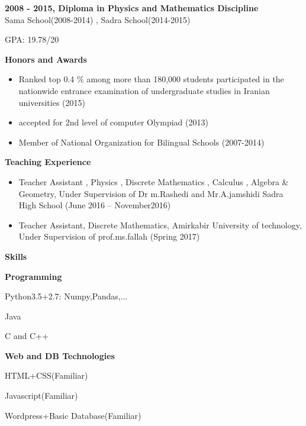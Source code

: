 \documentclass[a4paper,12pt,final]{memoir}
\newcommand{\Sep}{\vspace{1.5em}}
\newcommand{\SmallSep}{\vspace{0.5em}}
\newcommand{\CVSection}[1]
	{\Large\textbf{#1}\par
	\SmallSep\normalsize\normalfont}
\newcommand{\CVItem}[1]
	{\textbf{\color{RoyalBlue} #1}}
\begin{document}
\CVItem{2008 - 2015, Diploma in Physics and Mathematics Discipline}\\
Sama School(2008-2014) , Sadra School(2014-2015)

GPA: 19.78/20
\Sep

\CVSection{Honors and Awards}
\begin{itemize}
	\item Ranked top 0.4 \% among more than 180,000 students participated
in the nationwide entrance examination of undergraduate studies
in Iranian universities (2015) 

	\item accepted for 2nd level of computer Olympiad (2013)
	\item Member of National Organization for Bilingual Schools (2007-2014)
 
\end{itemize}

\Sep



\CVSection{Teaching Experience}
	\begin{itemize}
		\item  Teacher Assistant , Physics , Discrete Mathematics , Calculus ,  Algebra & Geometry, Under Supervision of Dr m.Rashedi and Mr.A.jamshidi
		Sadra High School (June 2016 – November2016)
	\item  Teacher Assistant, Discrete Mathematics, Amirkabir University of technology, Under Supervision of prof.ms.fallah (Spring 2017)
	\end{itemize}
\Sep

\newpage
\normalsize\normalfont
\framebreak
\framebreak


\CVSection{Skills}
\CVItem{Programming}
\begin{multicols}{3}
\begin{compactitem}[\color{RoyalBlue}$\circ$]
	\item Python3.5+2.7:
	Numpy,Pandas,...
	\item Java
	\item C and C++

	
\end{compactitem}
\end{multicols}
\SmallSep
\CVItem{Web and DB Technologies}

\begin{multicols}{3}
\begin{compactitem}[\color{RoyalBlue}$\circ$]
	\item HTML+CSS(Familiar)
	\item Javascript(Familiar)
	\item Wordpress+Basic Database(Familiar)
\end{compactitem}
\end{multicols}
\SmallSep
\end{document}

